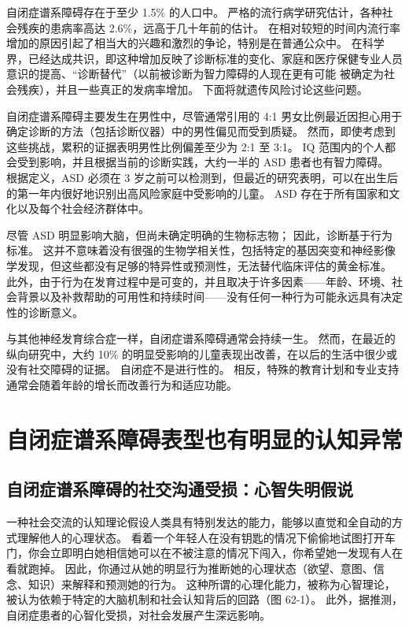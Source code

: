 自闭症谱系障碍存在于至少 1.5\% 的人口中。 严格的流行病学研究估计，各种社会残疾的患病率高达 2.6\%，远高于几十年前的估计。 在相对较短的时间内流行率增加的原因引起了相当大的兴趣和激烈的争论，特别是在普通公众中。 在科学界，已经达成共识，即这种增加反映了诊断标准的变化、家庭和医疗保健专业人员意识的提高、“诊断替代”（以前被诊断为智力障碍的人现在更有可能 被确定为社会残疾），并且一些真正的发病率增加。 下面将就遗传风险讨论这些问题。

自闭症谱系障碍主要发生在男性中，尽管通常引用的 4:1 男女比例最近因担心用于确定诊断的方法（包括诊断仪器）中的男性偏见而受到质疑。 然而，即使考虑到这些挑战，累积的证据表明男性比例偏差至少为 2:1 至 3:1。 IQ 范围内的个人都会受到影响，并且根据当前的诊断实践，大约一半的 ASD 患者也有智力障碍。 根据定义，ASD 必须在 3 岁之前可以检测到，但最近的研究表明，可以在出生后的第一年内很好地识别出高风险家庭中受影响的儿童。 ASD 存在于所有国家和文化以及每个社会经济群体中。

尽管 ASD 明显影响大脑，但尚未确定明确的生物标志物； 因此，诊断基于行为标准。 这并不意味着没有很强的生物学相关性，包括特定的基因突变和神经影像学发现，但这些都没有足够的特异性或预测性，无法替代临床评估的黄金标准。 此外，由于行为在发育过程中是可变的，并且取决于许多因素——年龄、环境、社会背景以及补救帮助的可用性和持续时间——没有任何一种行为可能永远具有决定性的诊断意义。

与其他神经发育综合症一样，自闭症谱系障碍通常会持续一生。 然而，在最近的纵向研究中，大约 10\% 的明显受影响的儿童表现出改善，在以后的生活中很少或没有社交障碍的证据。 自闭症不是进行性的。 相反，特殊的教育计划和专业支持通常会随着年龄的增长而改善行为和适应功能。

\section{自闭症谱系障碍表型也有明显的认知异常}


\subsection{自闭症谱系障碍的社交沟通受损：心智失明假说}
一种社会交流的认知理论假设人类具有特别发达的能力，能够以直觉和全自动的方式理解他人的心理状态。 看着一个年轻人在没有钥匙的情况下偷偷地试图打开车门，你会立即明白她相信她可以在不被注意的情况下闯入，你希望她一发现有人在看就跑掉。 因此，你通过从她的明显行为推断她的心理状态（欲望、意图、信念、知识）来解释和预测她的行为。 这种所谓的心理化能力，被称为心智理论，被认为依赖于特定的大脑机制和社会认知背后的回路（图 62-1）。 此外，据推测，自闭症患者的心智化受损，对社会发展产生深远影响。

